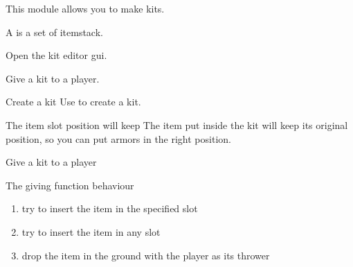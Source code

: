 This module allows you to make kits.

A  is a set of itemstack.

Open the kit editor gui.

Give a kit to a player.


\begin{example}{Create a kit}
    Use  to create a kit.

    \begin{note}{The item slot position will keep}
        The item put inside the kit will keep its original position, so you can put armors in the right position.
    \end{note}

\end{example}

\begin{example}{Give a kit to a player}
    \begin{note}{The giving function behaviour}
        \begin{enumerate}
            \item {try to insert the item in the specified slot}
            \item {try to insert the item in any slot}
            \item {drop the item in the ground with the player as its thrower}
        \end{enumerate}
    \end{note}
\end{example}


